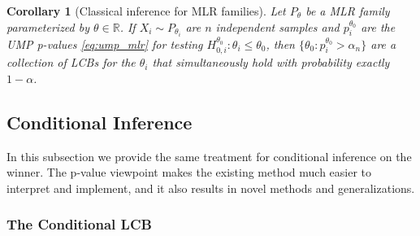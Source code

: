 \documentclass{article}
\newtheorem{corollary}{Corollary}
\newcommand{\R}{\mathbb{R}}
\begin{document}
\begin{corollary}[Classical inference for MLR families]
    \label{cor:class_mlr}
    Let $P_{\theta}$ be a MLR family parameterized by $\theta \in \R$. If $X_i \sim P_{\theta_i}$ are $n$ independent samples and $p^{\theta_0}_i$ are the UMP p-values \eqref{eq:ump_mlr} for testing $H^{\theta_0}_{0, i} : \theta_i \leq \theta_0 $, then $\{\theta_0 :  p^{\theta_0}_{i} > \alpha_n \}$ are a collection of LCBs for the $\theta_i$ that simultaneously hold with probability exactly $1-\alpha$. 
\end{corollary}

\subsection{Conditional Inference}

In this subsection we provide the same treatment for conditional inference on the winner. The p-value viewpoint makes the existing method much easier to interpret and implement, and it also results in novel methods and generalizations.  


\subsubsection{The Conditional LCB}
\label{sec:lcb_background}
\end{document}
